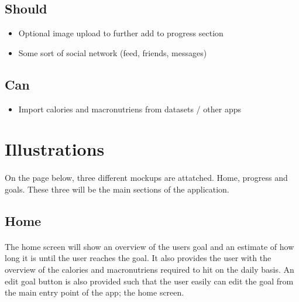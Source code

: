 \documentclass{article}
\begin{document}
        \hfill \break

      \subsection{Should}
        \begin{itemize}
          \item Optional image upload to further add to progress section
          \item Some sort of social network (feed, friends, messages)
        \end{itemize}

        \hfill \break

      \subsection{Can}
        \begin{itemize}
          \item Import calories and macronutriens from datasets / other apps
        \end{itemize}

  \newpage
  \section{Illustrations}
    \paragraph{}
    On the page below, three different mockups are attatched. Home, progress and goals. These three will be the main sections of the application.

    \hfill \break

    \subsection{Home}
      \paragraph{}
      The home screen will show an overview of the users goal and an estimate of how long it is until the user reaches the goal.
      It also provides the user with the overview of the calories and macronutriens required to hit on the daily basis. An edit goal button
      is also provided such that the user easily can edit the goal from the main entry point of the app; the home screen.

      \hfill \break
\end{document}
